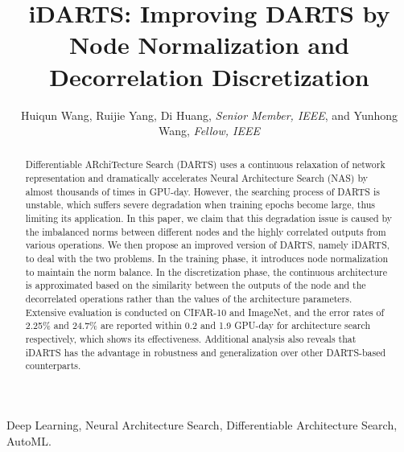 \documentclass[journal]{IEEEtran}
\begin{document}
\title{iDARTS: Improving DARTS by Node Normalization and Decorrelation Discretization}


\author{Huiqun Wang, Ruijie Yang, Di Huang, \textit{Senior Member, IEEE},  and Yunhong Wang, \textit{Fellow, IEEE}

}



\maketitle



\begin{abstract}
Differentiable ARchiTecture Search (DARTS) uses a continuous relaxation of network representation and dramatically accelerates Neural Architecture Search (NAS) by almost thousands of times in GPU-day. However, the searching process of DARTS is unstable, which suffers severe degradation when training epochs become large, thus limiting its application. In this paper, we claim that this degradation issue is caused by the imbalanced norms between different nodes and the highly correlated outputs from various operations. We then propose an improved version of DARTS, namely iDARTS, to deal with the two problems. In the training phase, it introduces node normalization to maintain the norm balance. In the discretization phase, the continuous architecture is approximated based on the similarity between the outputs of the node and the decorrelated operations rather than the values of the architecture parameters. Extensive evaluation is conducted on CIFAR-10 and ImageNet, and the error rates of 2.25\% and 24.7\% are reported within 0.2 and 1.9 GPU-day for architecture search respectively, which shows its effectiveness. Additional analysis also reveals that iDARTS has the advantage in robustness and generalization over other DARTS-based counterparts.

\end{abstract} 

\begin{IEEEkeywords}
Deep Learning, Neural Architecture Search, Differentiable Architecture Search, AutoML.
\end{IEEEkeywords}

\IEEEpeerreviewmaketitle
\end{document}
